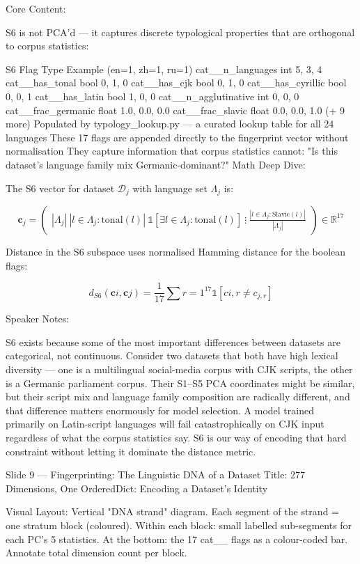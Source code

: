 Core Content:

S6 is not PCA'd — it captures discrete typological properties that are orthogonal to corpus statistics:

S6 Flag	Type	Example (en=1, zh=1, ru=1)
cat__n_languages	int	5, 3, 4
cat__has_tonal	bool	0, 1, 0
cat__has_cjk	bool	0, 1, 0
cat__has_cyrillic	bool	0, 0, 1
cat__has_latin	bool	1, 0, 0
cat__n_agglutinative	int	0, 0, 0
cat__frac_germanic	float	1.0, 0.0, 0.0
cat__frac_slavic	float	0.0, 0.0, 1.0
(+ 9 more)		
Populated by typology_lookup.py — a curated lookup table for all 24 languages
These 17 flags are appended directly to the fingerprint vector without normalisation
They capture information that corpus statistics cannot: "Is this dataset's language family mix Germanic-dominant?"
Math Deep Dive:

The S6 vector for dataset $\mathcal{D}_j$ with language set $\Lambda_j$ is:

$$\mathbf{c}_j = \begin{pmatrix} |\Lambda_j| \ |{l \in \Lambda_j : \text{tonal}(l)}| \ \mathbb{1}[\exists l \in \Lambda_j : \text{tonal}(l)] \ \vdots \ \frac{|{l \in \Lambda_j : \text{Slavic}(l)}|}{|\Lambda_j|} \end{pmatrix} \in \mathbb{R}^{17}$$

Distance in the S6 subspace uses normalised Hamming distance for the boolean flags:

$$d_{S6}(\mathbf{c}i, \mathbf{c}j) = \frac{1}{17} \sum{r=1}^{17} \mathbb{1}[c{i,r} \neq c_{j,r}]$$

Speaker Notes:

S6 exists because some of the most important differences between datasets are categorical, not continuous. Consider two datasets that both have high lexical diversity — one is a multilingual social-media corpus with CJK scripts, the other is a Germanic parliament corpus. Their S1–S5 PCA coordinates might be similar, but their script mix and language family composition are radically different, and that difference matters enormously for model selection. A model trained primarily on Latin-script languages will fail catastrophically on CJK input regardless of what the corpus statistics say. S6 is our way of encoding that hard constraint without letting it dominate the distance metric.

Slide 9 — Fingerprinting: The Linguistic DNA of a Dataset
Title: 277 Dimensions, One OrderedDict: Encoding a Dataset's Identity

Visual Layout: Vertical "DNA strand" diagram. Each segment of the strand = one stratum block (coloured). Within each block: small labelled sub-segments for each PC's 5 statistics. At the bottom: the 17 cat__ flags as a colour-coded bar. Annotate total dimension count per block.

